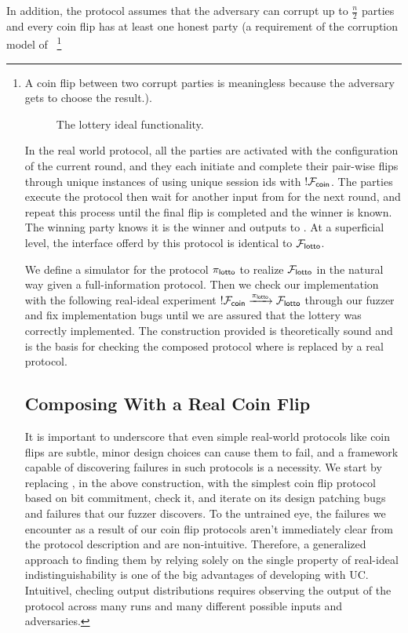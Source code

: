 In addition, the protocol assumes that the adversary can corrupt up to $\frac{n}{2}$ parties and every coin flip has at least one honest party (a requirement of the corruption model of \Fcoin~\footnote{A coin flip between two corrupt parties is meaningless because the adversary gets to choose the result.).

\begin{figure}
\centering

\caption{The lottery ideal functionality.}
\label{fig:flotto}
\end{figure}

In the real world protocol, all the parties are activated with the
configuration of the current round, and they each initiate and complete their
pair-wise flips through unique instances of \Fcoin using unique session ids with $!\mathcal{F}_{{\mathsf {coin}}}$.  
The parties execute the protocol then wait for
another input from \Z for the next round, and repeat this process until the final flip is
completed and the winner is known.  The winning party knows it is the winner and
outputs to \Z. At a superficial level, the interface offerd by this protocol is identical 
to $\mathcal{F}_{{\mathsf {lotto}}}$.

We define a simulator for the protocol $\pi_{{\mathsf {lotto}}}$ to realize
$\mathcal{F}_{{\mathsf {lotto}}}$ in the natural way given a full-information protocol.
Then we check our implementation with the following real-ideal experiment $!\mathcal{F}_{{\mathsf {coin}}}
\xrightarrow{\pi_{{\mathsf {lotto}}}} \mathcal{F}_{{\mathsf {lotto}}}$ through our fuzzer and fix
implementation bugs until we are assured that the lottery was correctly
implemented. The construction provided is theoretically sound and is the basis
for checking the composed protocol where \Fcoin is replaced by a real protocol. 

\subsection{Composing With a Real Coin Flip}
It is important to underscore that even simple real-world protocols like coin
flips are subtle, minor design choices can cause them to fail, and a framework
capable of discovering failures in such protocols is a necessity.  We start
by replacing \Fcoin, in the above construction, with the simplest coin flip protocol
based on bit commitment, check it, and iterate on its design
patching bugs and failures that our fuzzer discovers.
To the untrained eye, the failures we encounter as a result of our coin flip protocols
aren't immediately clear from the protocol description and are non-intuitive. 
Therefore, a generalized approach to finding them by relying solely on the single
property of real-ideal indistinguishability is one of the big advantages of developing with UC.
Intuitivel, checling output distributions requires
observing the output of the protocol across many runs and many different
possible inputs and adversaries.

}
